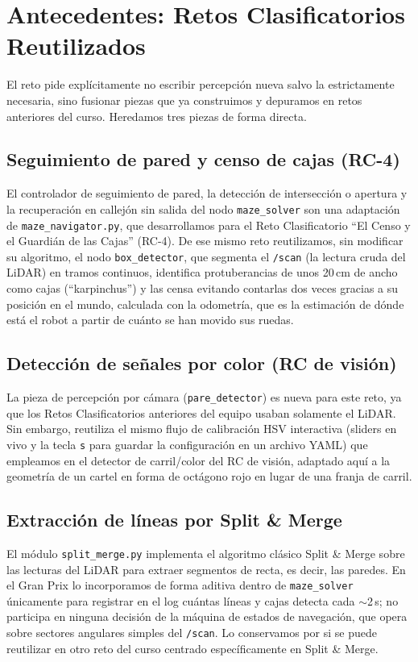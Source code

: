 \documentclass[conference]{IEEEtran}
\begin{document}
\section{Antecedentes: Retos Clasificatorios Reutilizados}

El reto pide explícitamente no escribir percepción nueva salvo la estrictamente necesaria, sino fusionar piezas que ya construimos y depuramos en retos anteriores del curso. Heredamos tres piezas de forma directa.

\subsection{Seguimiento de pared y censo de cajas (RC-4)}
El controlador de seguimiento de pared, la detección de intersección o apertura y la recuperación en callejón sin salida del nodo \texttt{maze\_solver} son una adaptación de \texttt{maze\_navigator.py}, que desarrollamos para el Reto Clasificatorio ``El Censo y el Guardián de las Cajas'' (RC-4). De ese mismo reto reutilizamos, sin modificar su algoritmo, el nodo \texttt{box\_detector}, que segmenta el \texttt{/scan} (la lectura cruda del LiDAR) en tramos continuos, identifica protuberancias de unos 20\,cm de ancho como cajas (``karpinchus'') y las censa evitando contarlas dos veces gracias a su posición en el mundo, calculada con la odometría, que es la estimación de dónde está el robot a partir de cuánto se han movido sus ruedas.

\subsection{Detección de señales por color (RC de visión)}
La pieza de percepción por cámara (\texttt{pare\_detector}) es nueva para este reto, ya que los Retos Clasificatorios anteriores del equipo usaban solamente el LiDAR. Sin embargo, reutiliza el mismo flujo de calibración HSV interactiva (sliders en vivo y la tecla \texttt{s} para guardar la configuración en un archivo YAML) que empleamos en el detector de carril/color del RC de visión, adaptado aquí a la geometría de un cartel en forma de octágono rojo en lugar de una franja de carril.

\subsection{Extracción de líneas por Split \& Merge}
El módulo \texttt{split\_merge.py} implementa el algoritmo clásico Split \& Merge sobre las lecturas del LiDAR para extraer segmentos de recta, es decir, las paredes. En el Gran Prix lo incorporamos de forma aditiva dentro de \texttt{maze\_solver} únicamente para registrar en el log cuántas líneas y cajas detecta cada $\sim$2\,s; no participa en ninguna decisión de la máquina de estados de navegación, que opera sobre sectores angulares simples del \texttt{/scan}. Lo conservamos por si se puede reutilizar en otro reto del curso centrado específicamente en Split \& Merge.
\end{document}
